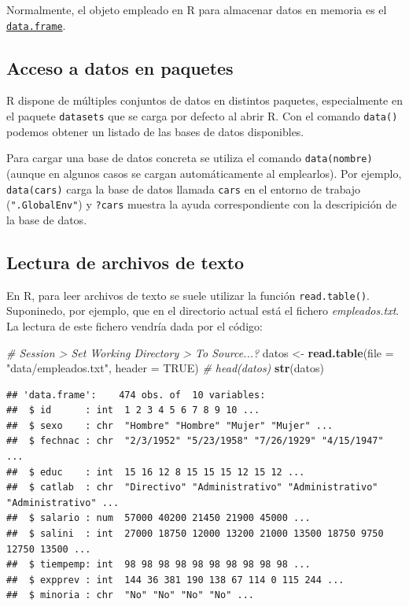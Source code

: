 \documentclass[
]{book}
\newenvironment{Shaded}{\begin{snugshade}}{\end{snugshade}}
\newcommand{\AttributeTok}[1]{\textcolor[rgb]{0.13,0.29,0.53}{#1}}
\newcommand{\CommentTok}[1]{\textcolor[rgb]{0.56,0.35,0.01}{\textit{#1}}}
\newcommand{\ConstantTok}[1]{\textcolor[rgb]{0.56,0.35,0.01}{#1}}
\newcommand{\FunctionTok}[1]{\textcolor[rgb]{0.13,0.29,0.53}{\textbf{#1}}}
\newcommand{\NormalTok}[1]{#1}
\newcommand{\OtherTok}[1]{\textcolor[rgb]{0.56,0.35,0.01}{#1}}
\newcommand{\StringTok}[1]{\textcolor[rgb]{0.31,0.60,0.02}{#1}}
\begin{document}
Normalmente, el objeto empleado en R para almacenar datos en memoria
es el \href{https://www.rdocumentation.org/packages/base/versions/3.6.1/topics/data.frame}{\texttt{data.frame}}.

\subsection{Acceso a datos en paquetes}\label{acceso-a-datos-en-paquetes}

R dispone de múltiples conjuntos de datos en distintos paquetes, especialmente en el paquete \texttt{datasets}
que se carga por defecto al abrir R.
Con el comando \texttt{data()} podemos obtener un listado de las bases de datos disponibles.

Para cargar una base de datos concreta se utiliza el comando
\texttt{data(nombre)} (aunque en algunos casos se cargan automáticamente al emplearlos).
Por ejemplo, \texttt{data(cars)} carga la base de datos llamada \texttt{cars} en el entorno de trabajo (\texttt{".GlobalEnv"})
y \texttt{?cars} muestra la ayuda correspondiente con la descripición de la base de datos.

\subsection{Lectura de archivos de texto}\label{cap2-texto}

En R, para leer archivos de texto se suele utilizar la función \texttt{read.table()}.
Suponinedo, por ejemplo, que en el directorio actual está el fichero
\emph{empleados.txt}. La lectura de este fichero vendría dada por el código:

\begin{Shaded}
\begin{Highlighting}[]
\CommentTok{\# Session \textgreater{} Set Working Directory \textgreater{} To Source...?}
\NormalTok{datos }\OtherTok{\textless{}{-}} \FunctionTok{read.table}\NormalTok{(}\AttributeTok{file =} \StringTok{"data/empleados.txt"}\NormalTok{, }\AttributeTok{header =} \ConstantTok{TRUE}\NormalTok{)}
\CommentTok{\# head(datos)}
\FunctionTok{str}\NormalTok{(datos)}
\end{Highlighting}
\end{Shaded}

\begin{verbatim}
## 'data.frame':    474 obs. of  10 variables:
##  $ id      : int  1 2 3 4 5 6 7 8 9 10 ...
##  $ sexo    : chr  "Hombre" "Hombre" "Mujer" "Mujer" ...
##  $ fechnac : chr  "2/3/1952" "5/23/1958" "7/26/1929" "4/15/1947" ...
##  $ educ    : int  15 16 12 8 15 15 15 12 15 12 ...
##  $ catlab  : chr  "Directivo" "Administrativo" "Administrativo" "Administrativo" ...
##  $ salario : num  57000 40200 21450 21900 45000 ...
##  $ salini  : int  27000 18750 12000 13200 21000 13500 18750 9750 12750 13500 ...
##  $ tiempemp: int  98 98 98 98 98 98 98 98 98 98 ...
##  $ expprev : int  144 36 381 190 138 67 114 0 115 244 ...
##  $ minoria : chr  "No" "No" "No" "No" ...
\end{verbatim}
\end{document}
